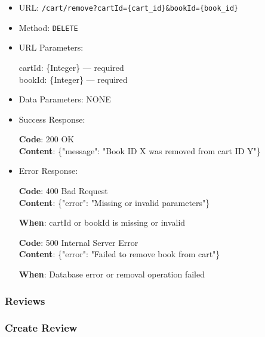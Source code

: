 \begin{itemize}
    \item URL: \texttt{/cart/remove?cartId=\{cart\_id\}&bookId=\{book\_id\}}
    \item Method: \texttt{DELETE}
    \item URL Parameters:

    cartId: \{Integer\} — required \\
    bookId: \{Integer\} — required

    \item Data Parameters: NONE

    \item Success Response: \newline

    \textbf{Code}: 200 OK \\
    \textbf{Content}: \{"message": "Book ID X was removed from cart ID Y"\}

    \item Error Response: \newline

    \textbf{Code}: 400 Bad Request \\
    \textbf{Content}: \{"error": "Missing or invalid parameters"\}

    \textbf{When}: cartId or bookId is missing or invalid \newline

    \textbf{Code}: 500 Internal Server Error \\
    \textbf{Content}: \{"error": "Failed to remove book from cart"\}

    \textbf{When}: Database error or removal operation failed
\end{itemize}

\subsubsection*{Reviews}

\subsubsection*{Create Review}

